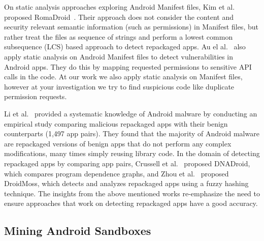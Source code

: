 On static analysis approaches exploring Android Manifest files, Kim et al. proposed RomaDroid~\cite{DBLP:journals/access/KimLCP19}.  Their approach does not consider the content and security relevant semantic information (such as permissions) in Manifest files, but rather treat the files as sequence of strings and perform a lowest common subsequence (LCS) based approach to detect repackaged apps. Au el al.~\cite{DBLP:conf/ccs/AuZHL12} also apply static analysis on Android Manifest files to detect vulnerabilities in Android apps. They do this by mapping requested permissions to sensitive API calls in the code. At our work we also apply static analysis on Manifest files, however at your investigation we try to find suspicious code like duplicate permission requests. %

Li et al.~\cite{DBLP:journals/tifs/0029LBKTLC17} provided a systematic knowledge of Android malware by conducting an empirical study comparing malicious repackaged apps with their benign counterparts (1,497 app pairs). They found that the majority of Android malware are repackaged versions of benign apps that do not perform any complex modifications, many times simply reusing library code.  In the domain of detecting repackaged apps by comparing app pairs, Crussell et al.~\cite{DBLP:conf/esorics/CrussellGC12} proposed  DNADroid, which compares program dependence graphs, and Zhou et al.~\cite{DBLP:conf/codaspy/ZhouZJN12} proposed DroidMoss, which detects and analyzes repackaged apps using a fuzzy hashing technique. The insights from the above mentioned works re-emphasize the need to ensure approaches that work on detecting repackaged apps have a good accuracy. 

\subsection{Mining Android Sandboxes}\label{sec:android-sandbox}

